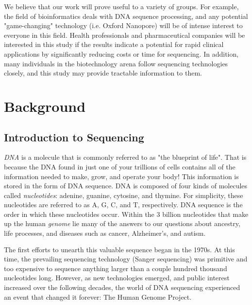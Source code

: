 \documentclass[12pt,letterpaper]{report}
\begin{document}
We believe that our work will prove useful to a variety of groups. For example, the field of bioinformatics deals with DNA sequence processing, and any potential "game-changing" technology (i.e. Oxford Nanopore) will be of intense interest to everyone in this field. Health professionals and pharmaceutical companies will be interested in this study if the results indicate a potential for rapid clinical applications by significantly reducing costs or time for sequencing. In addition, many individuals in the biotechnology arena follow sequencing technologies closely, and this study may provide tractable information to them.

\section{Background}

\subsection{Introduction to Sequencing}

\textit{DNA} is a molecule that is commonly referred to as "the blueprint of life". That is because the DNA found in just one of your trillions of cells contains all of the information needed to make, grow, and operate your body! This information is stored in the form of DNA sequence. DNA is composed of four kinds of molecules called \textit{nucleotides}: adenine, guanine, cytosine, and thymine. For simplicity, these nucleotides are referred to as A, G, C, and T, respectively. DNA sequence is the order in which these nucleotides occur. Within the 3 billion nucleotides that make up the human \textit{genome} lie many of the answers to our questions about ancestry, life processes, and diseases such as cancer, Alzheimer's, and autism.

The first efforts to unearth this valuable sequence began in the 1970s. At this time, the prevailing sequencing technology (Sanger sequencing) was primitive and too expensive to sequence anything larger than a couple hundred thousand nucleotides long. However, as new technologies emerged, and public interest increased over the following decades, the world of DNA sequencing experienced an event that changed it forever: The Human Genome Project. 
\end{document}
